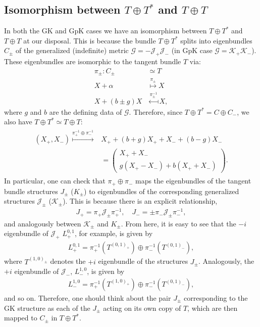 \documentclass{article}
\newcommand{\TT}{{T\oplus T^*}}
\newcommand{\JJ}{\mathcal{J}}
\newcommand{\KK}{\mathcal{K}}
\newcommand{\GG}{\mathcal{G}}
\newcommand{\ap}{\alpha}
\theoremstyle{definition}
\theoremstyle{definition}
\theoremstyle{remark}
\begin{document}
\subsection{Isomorphism between $\TT$ and $T\oplus T$}\label{sec:isomorphism}
In both the GK and GpK cases we have an isomorphism between $\TT$ and $T\oplus T$ at our disposal. This is because  the bundle $\TT$ splits into eigenbundles $C_\pm$ of the generalized (indefinite) metric $\GG=-\JJ_+\JJ_-$ (in GpK case $\GG=\KK_+\KK_-$). These eigenbundles are isomorphic to the tangent bundle $T$ via:
\begin{align*}
\pi_\pm:C_\pm &\simeq T\\
X+\ap &\overset{\pi_\pm}{\mapsto} X\\
X+(b\pm g)X &\overset{\pi^{-1}_\pm}{\mapsfrom} X,
\end{align*}
where $g$ and $b$ are the defining data of $\GG$. Therefore, since $\TT=C\oplus C_-$, we also have $\TT\simeq T\oplus T$:
\begin{align}
\begin{aligned}
(X_+,X_-)\overset{\pi^{-1}_+\oplus \pi^{-1}_-}{\longmapsto}& X_++(b+g)X_++X_-+(b-g)X_-\\
&=
\begin{pmatrix}
 X_++X_- \\
 g(X_+-X_-)+b(X_++X_-)
\end{pmatrix}.
\end{aligned}\label{map_pi_pm}
\end{align}
In particular, one can check that $\pi_+\oplus \pi_-$ maps the eigenbundles of the tangent bundle structures $J_\pm$ ($K_\pm$) to eigenbundles of the corresponding generalized structures $\JJ_\pm$ ($\KK_\pm$). This is because there is an explicit relationship,
\begin{align*}
J_+=\pi_+\JJ_\pm\pi_+^{-1},\quad J_-=\pm\pi_-\JJ_\pm\pi_-^{-1},
\end{align*}
and analogously between $\KK_\pm$ and $K_\pm$. From here, it is easy to see that the $-i$ eigenbundle of $\JJ_+$ $L^{0,1}_+$, for example, is given by
\begin{align*}
L^{0,1}_+=\pi_+^{-1}(T^{(0,1)_+})\oplus\pi_-^{-1}(T^{(0,1)_-}),
\end{align*}
where $T^{(1,0)_\pm}$ denotes the $+i$ eigenbundle of the structures $J_\pm$. Analogously, the $+i$ eigenbundle of $\JJ_-$,
$L^{1,0}_-$, is given by
\begin{align*}
L^{1,0}_-=\pi_+^{-1}(T^{(1,0)_+})\oplus\pi_-^{-1}(T^{(0,1)_-}),
\end{align*}
and so on. Therefore, one should think about the pair $J_\pm$ corresponding to the GK structure as each of the $J_\pm$ acting on its own copy of $T$, which are then mapped to $C_\pm$ in $\TT$.
\end{document}
